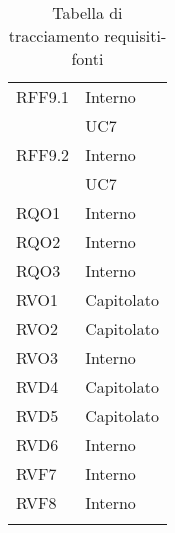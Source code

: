 \begin{center}
\begin{longtable}{ | >{\centering\arraybackslash}m{5cm} | >{\centering\arraybackslash}m{5cm} | }
        RFF9.1 & Interno\\
            & UC7 \\
\hline

        RFF9.2 & Interno\\
            & UC7 \\
\hline

        RQO1 & Interno\\
\hline

        RQO2 & Interno\\
\hline

        RQO3 & Interno\\
\hline

        RVO1 & Capitolato\\
\hline

        RVO2 & Capitolato\\
\hline

        RVO3 & Interno\\
\hline

        RVD4 & Capitolato\\
\hline

        RVD5 & Capitolato\\
\hline

        RVD6 & Interno\\
\hline

        RVF7 & Interno\\
\hline

        RVF8 & Interno\\
\hline



       	\caption[Tracciamento requisiti-fonti]{Tabella di tracciamento requisiti-fonti}
	\end{longtable}
	
\end{center}
